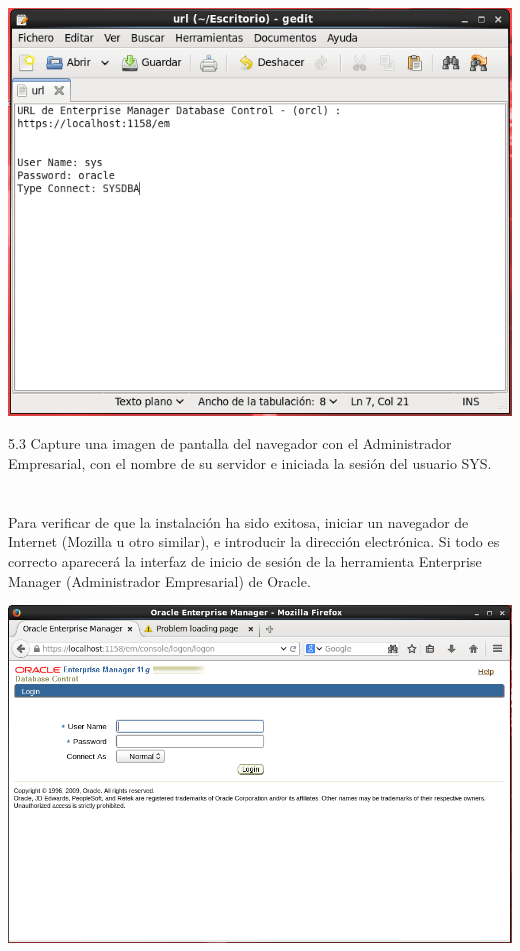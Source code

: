 	\begin{center}
		\includegraphics[width=15cm]{./Imagenes/94} 
	\end{center}

\vspace{\baselineskip}

5.3 Capture una imagen de pantalla del navegador con el Administrador Empresarial, con el nombre de su servidor e iniciada la sesión del usuario SYS.\\
\\
\\Para verificar de que la instalación ha sido exitosa, iniciar un navegador de Internet (Mozilla u otro similar), e introducir la dirección electrónica. Si todo es correcto aparecerá la interfaz de inicio de sesión de la herramienta Enterprise Manager (Administrador Empresarial) de Oracle.\\
\begin{center}
	\includegraphics[width=16cm]{./Imagenes/91} 
\end{center}

